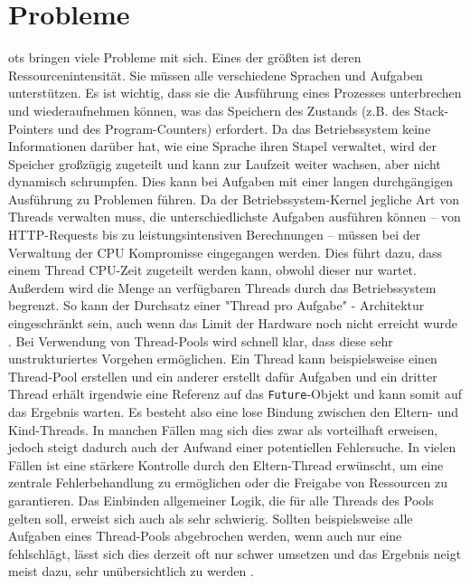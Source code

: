     
\section{Probleme}                                         
\label{sec:Probleme}

    \Glspl{ot} bringen viele Probleme mit sich. Eines der größten ist deren Ressourcenintensität.
    Sie müssen alle verschiedene Sprachen und Aufgaben unterstützen. Es ist wichtig, dass sie die Ausführung eines Prozesses unterbrechen und
    wiederaufnehmen können, 
    was das Speichern des Zustands (z.B. des Stack-Pointers und des Program-Counters) erfordert. Da das Betriebssystem keine Informationen darüber hat, wie
    eine Sprache ihren Stapel verwaltet, wird der Speicher großzügig zugeteilt und kann zur Laufzeit weiter wachsen, aber nicht dynamisch schrumpfen. Dies kann
    bei Aufgaben mit einer langen durchgängigen Ausführung zu Problemen führen. Da der Betriebssystem-Kernel jegliche Art von Threads verwalten muss,
    die unterschiedlichste Aufgaben ausführen können -- von HTTP-Requests bis zu leistungsintensiven Berechnungen -- müssen bei der
    Verwaltung der CPU Kompromisse eingegangen werden. Dies führt dazu, dass einem Thread CPU-Zeit zugeteilt werden kann, obwohl dieser nur wartet. Außerdem wird die Menge 
    an verfügbaren Threads durch das Betriebssystem begrenzt. So kann der Durchsatz einer "Thread pro Aufgabe" - Architektur eingeschränkt sein, auch wenn das Limit der 
    Hardware noch nicht erreicht wurde \cite{ProjectLoom}. Bei Verwendung von Thread-Pools wird schnell klar, dass diese sehr unstrukturiertes Vorgehen ermöglichen. Ein Thread kann beispielsweise 
    einen Thread-Pool erstellen und ein anderer erstellt dafür Aufgaben und ein dritter Thread erhält irgendwie eine Referenz auf das \texttt{Future}-Objekt und kann somit auf das Ergebnis warten.
    Es besteht also eine lose Bindung zwischen den Eltern- und Kind-Threads. In manchen Fällen mag sich dies zwar als vorteilhaft erweisen, jedoch steigt dadurch auch der Aufwand einer potentiellen 
    Fehlersuche. In vielen Fällen ist eine stärkere Kontrolle durch den Eltern-Thread erwünscht, um \zB eine zentrale Fehlerbehandlung zu ermöglichen oder die Freigabe von Ressourcen zu garantieren.
    Das Einbinden allgemeiner Logik, die für alle Threads des Pools gelten soll, erweist sich auch als sehr schwierig. Sollten beispielsweise alle Aufgaben eines Thread-Pools abgebrochen werden,
    wenn auch nur eine fehlschlägt, lässt sich dies derzeit oft nur schwer umsetzen und das Ergebnis neigt meist dazu, sehr unübersichtlich zu werden \cite{JEP453}. 
    

